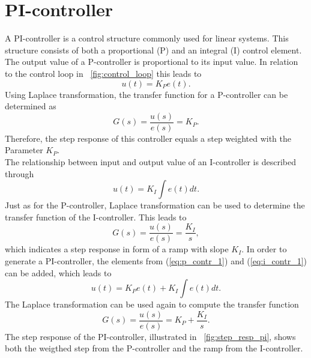 \section{PI-controller}
A PI-controller is a control structure commonly used for linear systems. This structure consists of both a proportional (P) and an integral (I) control element.
The output value of a P-controller is proportional to its input value. In relation to the control loop in \figurename~\ref{fig:control_loop} this leads to
\begin{equation}
    u(t) = K_{P}e(t).
 \label{eq:p_contr_1}
\end{equation}
Using Laplace transformation, the transfer function for a P-controller can be determined as
\begin{equation}
    G(s) = \frac{u(s)}{e(s)} = K_{P}.
 \label{eq:p_contr_2}
\end{equation}
Therefore, the step response of this controller equals a step weighted with the Parameter $K_{P}$.
\\The relationship between input and output value of an I-controller is described through
\begin{equation}
    u(t) = K_{I}\int e(t) dt.
 \label{eq:i_contr_1}
\end{equation}
Just as for the P-controller, Laplace transformation can be used to determine the transfer function of the I-controller.
This leads to
\begin{equation}
    G(s) = \frac{u(s)}{e(s)} = \frac{K_{I}}{s},
 \label{eq:i_contr_2}
\end{equation}
which indicates a step response in form of a ramp with slope $K_{I}$.
In order to generate a PI-controller, the elements from (\ref{eq:p_contr_1}) and (\ref{eq:i_contr_1}) can be added, which leads to
\begin{equation}
    u(t) = K_{P}e(t) + K_{I}\int e(t) dt.
 \label{eq:pi_contr_1}
\end{equation}
The Laplace transformation can be used again to compute the transfer function
\begin{equation}
    G(s) = \frac{u(s)}{e(s)} =  K_{P} + \frac{K_{I}}{s}.
 \label{eq:pi_contr_2}
\end{equation}
The step response of the PI-controller, illustrated in \figurename~\ref{fig:step_resp_pi}, shows both the weigthed step from the P-controller and the ramp from the I-controller.

